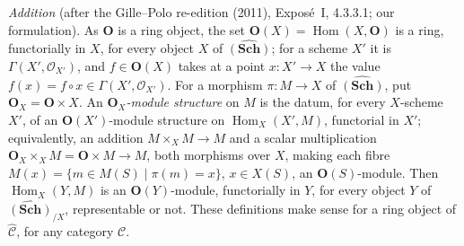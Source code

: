 \par\medskip\noindent{}%
\emph{Addition} (after the Gille--Polo re-edition (2011), Exposé~I,
4.3.3.1; our formulation). As \(\mathbf O\) is a ring object, the set
\(\mathbf O(X)=\operatorname{Hom}(X,\mathbf O)\) is a ring, functorially in
\(X\), for every object \(X\) of \(\widehat{(\mathbf{Sch})}\); for a scheme
\(X'\) it is \(\Gamma(X',\mathcal O_{X'})\), and \(f\in\mathbf O(X)\) takes at
a point \(x:X'\to X\) the value \(f(x)=f\circ x\in\Gamma(X',\mathcal O_{X'})\).
For a morphism \(\pi:M\to X\) of \(\widehat{(\mathbf{Sch})}\), put
\(\mathbf O_X=\mathbf O\times X\). An \emph{\(\mathbf O_X\)-module
structure} on \(M\) is the datum, for every \(X\)-scheme \(X'\), of an
\(\mathbf O(X')\)-module structure on \(\operatorname{Hom}_X(X',M)\),
functorial in \(X'\); equivalently, an addition \(M\times_XM\to M\) and a
scalar multiplication \(\mathbf O_X\times_XM=\mathbf O\times M\to M\), both
morphisms over \(X\), making each fibre
\(M(x)=\{m\in M(S)\mid\pi(m)=x\}\), \(x\in X(S)\), an
\(\mathbf O(S)\)-module. Then \(\operatorname{Hom}_X(Y,M)\) is an
\(\mathbf O(Y)\)-module, functorially in \(Y\), for every object \(Y\) of
\(\widehat{(\mathbf{Sch})}_{/X}\), representable or not. These definitions
make sense for a ring object of \(\widehat{\mathscr C}\), for any category
\(\mathscr C\).
\par\medskip


